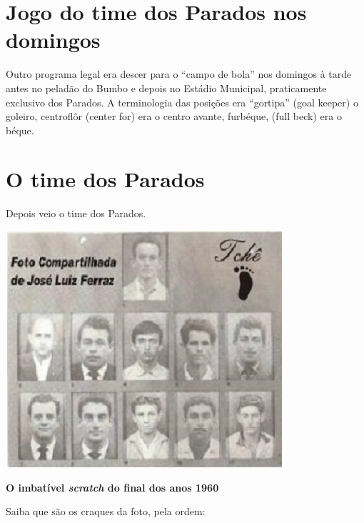 \documentclass[12pt,brazil,]{book}
\begin{document}
\section{Jogo do time dos Parados nos
domingos}\label{jogo-do-time-dos-parados-nos-domingos}

Outro programa legal era descer para o ``campo de bola'' nos domingos à
tarde antes no peladão do Bumbo e depois no Estádio Municipal,
praticamente exclusivo dos Parados. A terminologia das posições era
``gortipa'' (goal keeper) o goleiro, centroflôr (center for) era o
centro avante, furbéque, (full beck) era o béque.

\section{O time dos Parados}\label{o-time-dos-parados}

Depois veio o time dos Parados.

\includegraphics{Imagens/time dos Parados2.jpeg}

\textbf{O imbatível \emph{scratch} do final dos anos 1960}

Saiba que são os craques da foto, pela ordem:
\end{document}
